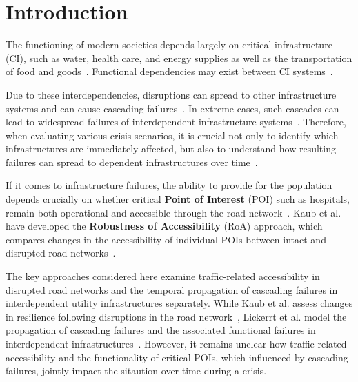 
\newpage

\section{Introduction}
\label{sec:introduction}


The functioning of modern societies depends largely on critical infrastructure (CI), such as water, health care, and energy supplies as well as the transportation of food and goods~\cite{lickert2024,chiaradonna2007}. Functional dependencies may exist between CI systems~\cite{chiaradonna2007}.


Due to these interdependencies, disruptions can spread to other infrastructure systems and can cause cascading failures~\cite{laprie2007}. In extreme cases, such cascades can lead to widespread failures of interdependent infrastructure systems~\cite{buldyrev2010}. Therefore, when evaluating various crisis scenarios, it is crucial not only to identify which infrastructures are immediately affected, but also to understand how resulting failures can spread to dependent infrastructures over time~\cite{lickert2024}.

If it comes to infrastructure failures, the ability to provide for the population depends crucially on whether critical \textbf{Point of Interest} (POI) such as hospitals, remain both operational and accessible through the road network~\cite{kaub2024,lickert2024}. Kaub et al. have developed the \textbf{Robustness of Accessibility} (RoA) approach, which compares changes in the accessibility of individual POIs between intact and disrupted road networks~\cite{kaub2024}.




The key approaches considered here examine traffic-related accessibility in disrupted road networks and the temporal propagation of cascading failures in interdependent utility infrastructures separately. While Kaub et al. assess changes in resilience following disruptions in the road network~\cite{kaub2024}, Lickerrt et al. model the propagation of cascading failures and the associated functional failures in interdependent infrastructures~\cite{lickert2024}. Howeever, it remains unclear how traffic-related accessibility and the functionality of critical POIs, which influenced by cascading failures, jointly impact the sitaution over time during a crisis.





